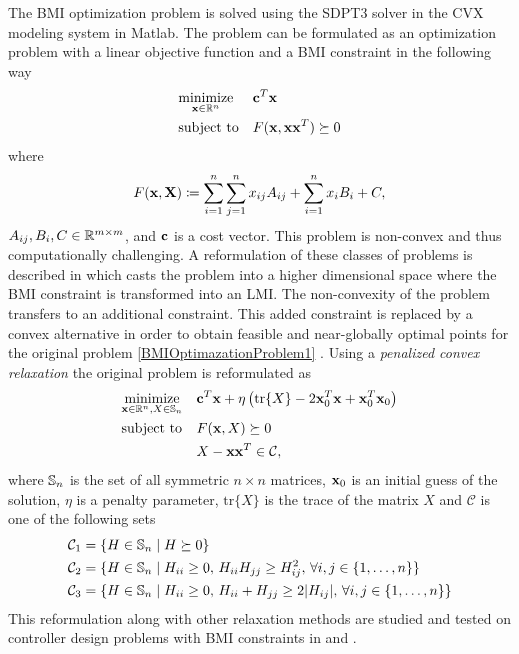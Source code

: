 \documentclass[a4paper,12pt,twoside,BCOR=10mm]{scrbook}
\begin{document}
The BMI optimization problem is solved using the SDPT3 solver in the CVX modeling system in Matlab. The problem can be formulated as an optimization problem with a linear objective function and a BMI constraint in the following way
\begin{align}\label{BMIOptimazationProblem1}
    \begin{aligned}
    & \underset{\mathbf{x}\in \mathbb{R}^{n}}{\text{minimize}} & & \mathbf{c}^T\mathbf{x}\\
    & \text{subject to} & & F(\mathbf{x},\mathbf{x}\mathbf{x}^T) \succeq 0
    \end{aligned}
\end{align}
where
\begin{align*}
    F(\mathbf{x}, \mathbf{X}) \coloneqq \sum_{i = 1}^n\sum_{j = 1}^n x_{ij}A_{ij} + \sum_{i = 1}^nx_iB_i + C,
\end{align*}
$A_{ij}, B_i, C \in \mathbb{R}^{m\times m}$, and $\mathbf{c}$ is a cost vector. This problem is non-convex and thus computationally challenging. A reformulation of these classes of problems is described in \citep{KZM2018BMI1} which casts the problem into a higher dimensional space where the BMI constraint is transformed into an LMI. The non-convexity of the problem transfers to an additional constraint. This added constraint is replaced by a convex alternative in order to obtain feasible and near-globally optimal points for the original problem \eqref{BMIOptimazationProblem1} \citep{KZM2018BMI1}. Using a \textit{penalized convex relaxation} the original problem is reformulated as
\begin{align*}
    \begin{aligned}
    & \underset{\mathbf{x} \in \mathbb{R}^{n}, X \in \mathbb{S}_n}{\text{minimize}} & & \mathbf{c}^T\mathbf{x} + \eta\left(\text{tr}\{X\} - 2\mathbf{x}_0^T\mathbf{x} + \mathbf{x}_0^T\mathbf{x}_0\right)\\
    & \text{subject to} & & F(\mathbf{x}, X) \succeq 0\\
    & & & X - \mathbf{x}\mathbf{x}^T \in \mathcal{C},
    \end{aligned}
\end{align*}
where $\mathbb{S}_n$ is the set of all symmetric $n \times n$ matrices, $\mathbf{x}_0$ is an initial guess of the solution, $\eta$ is a penalty parameter, $\text{tr}\{X\}$ is the trace of the matrix $X$ and $\mathcal{C}$ is one of the following sets
\begin{align*}
    &\mathcal{C}_1 = \{H\in \mathbb{S}_n \mid H\succeq 0\}\\
    &\mathcal{C}_2 = \{H\in \mathbb{S}_n \mid H_{ii} \geq 0,\, H_{ii}H_{jj} \geq H_{ij}^2, \, \forall i,j\in\{1,\ldots, n\}\}\\
    &\mathcal{C}_3 = \{H\in\mathbb{S}_n \mid H_{ii} \geq 0, \, H_{ii} + H_{jj} \geq 2|H_{ij}|,\, \forall i,j\in\{1,\ldots, n\}\}
\end{align*}
This reformulation along with other relaxation methods are studied and tested on controller design problems with BMI constraints in \citep{KZM2018BMI1} and \citep{KZM2018BMI2}.
\end{document}
